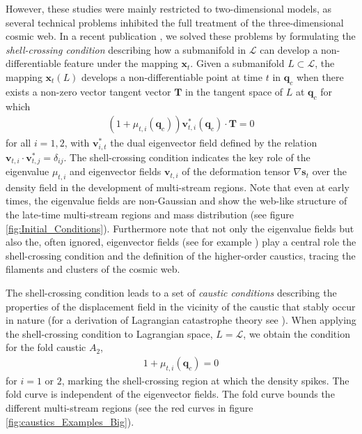 \documentclass[a4paper, 11pt]{article}
\begin{document}
However, these studies were mainly restricted to two-dimensional models, as several technical problems inhibited the full treatment of the three-dimensional cosmic web. In a recent publication \cite{Feldbrugge:2018}, we solved these problems by formulating the \textit{shell-crossing condition} describing how a submanifold in $\mathcal{L}$ can develop a non-differentiable feature under the mapping $\bm{x}_t$. Given a submanifold $L \subset \mathcal{L}$, the mapping $\bm{x}_t(L)$ develops a non-differentiable point at time $t$ in $\bm{q}_c$ when there exists a non-zero vector tangent vector $\bm{T}$ in the tangent space of $L$ at $\bm{q}_c$ for which 
\begin{align}
(1+\mu_{t,i}(\bm{q}_c))\bm{v}_{t,i}^*(\bm{q}_c) \cdot \bm{T}=0
\label{eq:shellCrossingCondition}
\end{align}
for all $i=1,2$, with $\bm{v}_{i,t}^*$ the dual eigenvector field defined by the relation $\bm{v}_{t,i}\cdot \bm{v}_{t,j}^* = \delta_{ij}$. The shell-crossing condition indicates the key role of the eigenvalue $\mu_{t,i}$ and eigenvector fields $\bm{v}_{t,i}$ of the deformation tensor $\nabla \bm{s}_t$ over the density field in the development of multi-stream regions. Note that even at early times, the eigenvalue fields are non-Gaussian and show the web-like structure of the late-time multi-stream regions and mass distribution (see figure \ref{fig:Initial_Conditions}). Furthermore note that not only the eigenvalue fields but also the, often ignored, eigenvector fields (see for example \cite{Forero:2009}) play a central role the shell-crossing condition and the definition of the higher-order caustics, tracing the filaments and clusters of the cosmic web.

The shell-crossing condition leads to a set of \textit{caustic conditions} describing the properties of the displacement field in the vicinity of the caustic that stably occur in nature (for a derivation of Lagrangian catastrophe theory see \cite{Arnold:1972, Arnold:1976, Poston:1978, Gilmore:1981, Kravtsov:1983, Arnold:1984, Arnold:2012a, Arnold:2012b}). When applying the shell-crossing condition to Lagrangian space, $L=\mathcal{L}$, we obtain the condition for the fold caustic $A_2$,
\begin{align}
1+\mu_{t,i}(\bm{q}_c)=0
\end{align}
for $i=1$ or $2$, marking the shell-crossing region at which the density spikes. The fold curve is independent of the eigenvector fields. The fold curve bounds the different multi-stream regions (see the red curves in figure \ref{fig:caustics_Examples_Big}).
\end{document}
